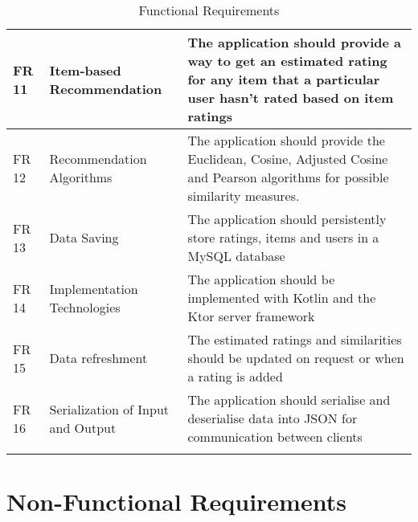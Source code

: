 \begin{longtable}{|p{1.2cm}||p{3.2cm}|p{9cm}|}
	\hline
    FR 11 & Item-based Recommendation & The application should provide a way to get an estimated rating for any item that a particular user hasn't rated based on item ratings \\
	\hline
    FR 12 & Recommendation Algorithms & The application should provide the Euclidean, Cosine, Adjusted Cosine and Pearson algorithms for possible similarity measures. \\
	\hline
    FR 13 & Data Saving & The application should persistently store ratings, items and users in a MySQL database \\
	\hline
    FR 14 & Implementation Technologies & The application should be implemented with Kotlin and the Ktor server framework \\
	\hline
    FR 15 & Data refreshment & The estimated ratings and similarities should be updated on request or when a rating is added \\
	\hline
    FR 16 & Serialization of Input and Output & The application should serialise and deserialise data into JSON for communication between clients\\
	\hline

  \caption{Functional Requirements}
  \label{tab:fas}
\end{longtable}


\section{Non-Functional Requirements}